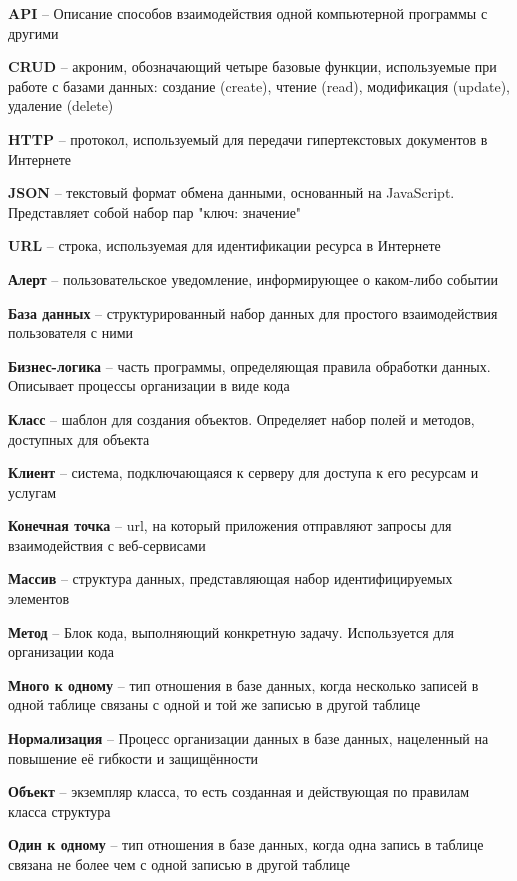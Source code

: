 \documentclass[a4paper,article]{article}
\begin{document}
    \textbf{API} -- Описание способов взаимодействия одной компьютерной программы с другими~\cite{apiwikipedia}

    \textbf{CRUD} -- акроним, обозначающий четыре базовые функции, используемые при работе с базами данных: создание (create), чтение (read), модификация (update), удаление (delete)

    \textbf{HTTP} -- протокол, используемый для передачи гипертекстовых документов в Интернете

    \textbf{JSON} -- текстовый формат обмена данными, основанный на JavaScript. Представляет собой набор пар "ключ: значение"

    \textbf{URL} -- строка, используемая для идентификации ресурса в Интернете

    \textbf{Алерт} -- пользовательское уведомление, информирующее о каком-либо событии

    \textbf{База данных} -- структурированный набор данных для простого взаимодействия пользователя с ними

    \textbf{Бизнес-логика} -- часть программы, определяющая правила обработки данных. Описывает процессы организации в виде кода

    \textbf{Класс} -- шаблон для создания объектов. Определяет набор полей и методов, доступных для объекта

    \textbf{Клиент} -- система, подключающаяся к серверу для доступа к его ресурсам и услугам

    \textbf{Конечная точка} -- url, на который приложения отправляют запросы для взаимодействия с веб-сервисами

    \textbf{Массив} -- структура данных, представляющая набор идентифицируемых элементов

    \textbf{Метод} -- Блок кода, выполняющий конкретную задачу. Используется для организации кода

    \textbf{Много к одному} -- тип отношения в базе данных, когда несколько записей в одной таблице связаны с одной и той же записью в другой таблице

    \textbf{Нормализация} -- Процесс организации данных в базе данных, нацеленный на повышение её гибкости и защищённости

    \textbf{Объект} -- экземпляр класса, то есть созданная и действующая по правилам класса структура

    \textbf{Один к одному} -- тип отношения в базе данных, когда одна запись в таблице связана не более чем с одной записью в другой таблице
\end{document}
